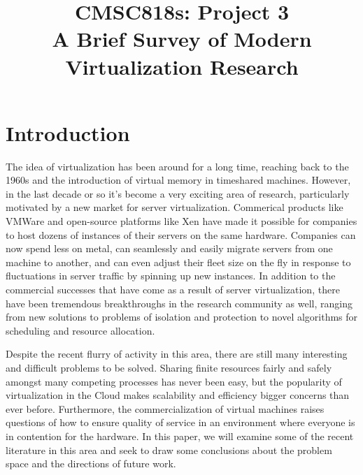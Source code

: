 \documentclass[letterpaper, twocolumn]{article}
\title{CMSC818s: Project 3 \\
A Brief Survey of Modern Virtualization Research}
\author{}
\date{}
\begin{document}

\section{Introduction}
\label{sec:intro}

The idea of virtualization has been around for a long time, reaching back
to the 1960s and the introduction of virtual memory in timeshared machines.
However, in the last decade or so it's become a very exciting area of research,
particularly motivated by a new market for server virtualization.  Commerical
products like VMWare and open-source platforms like Xen \cite{ref:xen} have made
it possible for companies to host dozens of instances of their servers
on the same hardware.  Companies can now spend less on metal, can seamlessly and
easily migrate servers from one machine to another, and can even adjust their fleet
size on the fly in response to fluctuations in server traffic by spinning up new
instances.  In addition to the commercial successes that have come as a result
of server virtualization, there have been tremendous breakthroughs in the research
community as well, ranging from new solutions to problems of isolation and protection
to novel algorithms for scheduling and resource allocation.

Despite the recent flurry of activity in this area, there are still many interesting
and difficult problems to be solved.  Sharing finite resources
fairly and safely amongst many competing processes has never been easy, but
the popularity of virtualization in the Cloud makes scalability and efficiency
bigger concerns than ever before.  Furthermore, the commercialization of
virtual machines raises questions of how to ensure quality of service in
an environment where everyone is in contention for the hardware.  In this
paper, we will examine some of the recent literature in this area and
seek to draw some conclusions about the problem space and the directions
of future work.
\end{document}
